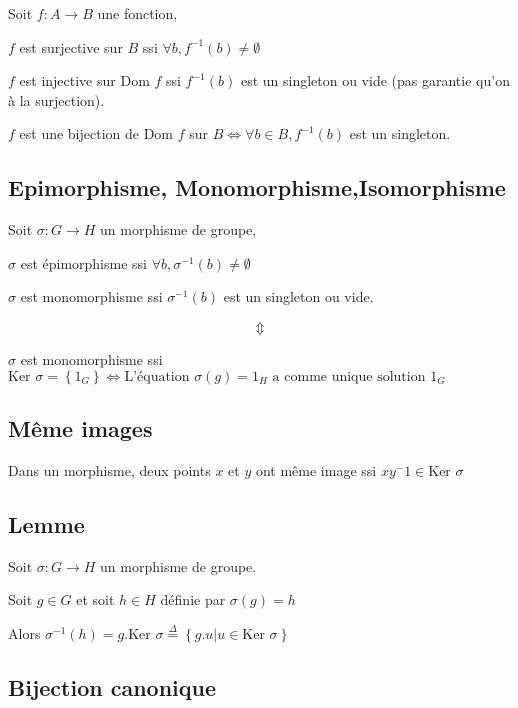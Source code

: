 \documentclass[a4paper,10pt]{article}
\newcommand{\dom}{\mbox{Dom }}
\newcommand{\Ker}{\mbox{Ker }}
\newcommand{\ap}{\rightarrow}
\newcommand{\ioi}{\Leftrightarrow}
\newcommand{\tset}[1]{\left\lbrace #1 \right\rbrace}
\begin{document}
Soit $f : A \ap B$ une fonction,

$f$ est surjective sur $B$ ssi $\forall b, f^{-1}(b) \neq \emptyset$

$f$ est injective sur $\dom f$ ssi $f^{-1}(b)$ est un singleton ou vide (pas garantie qu'on à la surjection).

$f$ est une bijection de $\dom f$ sur $B \ioi \forall b \in B, f^{-1}(b)$ est un singleton. 

\subsection{Epimorphisme, Monomorphisme,Isomorphisme}

Soit $\sigma : G \ap H$ un morphisme de groupe,

$\sigma$ est épimorphisme ssi $\forall b, \sigma^{-1}(b) \neq \emptyset$

$\sigma$ est monomorphisme ssi $\sigma^{-1}(b)$ est un singleton ou vide.

$$\Updownarrow$$

$\sigma$ est monomorphisme ssi $\Ker \sigma = \tset{1_G} \ioi \mbox{L'équation } \sigma(g) = 1_H \mbox{ a comme unique solution } 1_G$

\subsection{Même images}

Dans un morphisme, deux points $x$ et $y$ ont même image ssi $xy^-1 \in \Ker \sigma$

\newpage

\subsection{Lemme}

Soit $\sigma : G \ap H$ un morphisme de groupe.

Soit $g \in G$ et soit $h \in H$ définie par $\sigma(g) = h$

Alors $\sigma^{-1}(h) = g . \Ker{\sigma} \stackrel{\Delta}{=} \tset{g.u \vert u \in \Ker \sigma}$

\begin{figure}[h]
	\centering{}
\end{figure}

\subsection{Bijection canonique}
\end{document}
